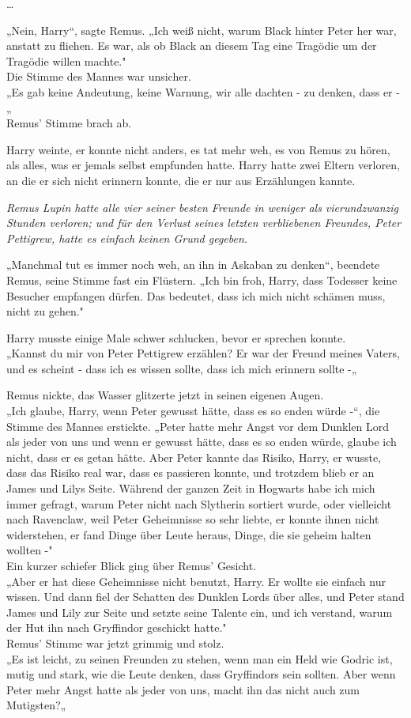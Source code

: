 {…

„Nein, Harry“, sagte Remus. „Ich weiß nicht, warum Black hinter Peter her war, anstatt zu fliehen. Es war, als ob Black an diesem Tag eine Tragödie um der Tragödie willen machte."\\ Die Stimme des Mannes war unsicher.\\ „Es gab keine Andeutung, keine Warnung, wir alle dachten - zu denken, dass er -„\\ Remus' Stimme brach ab.

Harry weinte, er konnte nicht anders, es tat mehr weh, es von Remus zu hören, als alles, was er jemals selbst empfunden hatte. Harry hatte zwei Eltern verloren, an die er sich nicht erinnern konnte, die er nur aus Erzählungen kannte.

\emph{Remus Lupin hatte alle vier seiner besten Freunde in weniger als vierundzwanzig Stunden verloren; und für den Verlust seines letzten verbliebenen Freundes, Peter Pettigrew, hatte es einfach keinen Grund gegeben.}

„Manchmal tut es immer noch weh, an ihn in Askaban zu denken“, beendete Remus, seine Stimme fast ein Flüstern. „Ich bin froh, Harry, dass Todesser keine Besucher empfangen dürfen. Das bedeutet, dass ich mich nicht schämen muss, nicht zu gehen."

Harry musste einige Male schwer schlucken, bevor er sprechen konnte.\\ „Kannst du mir von Peter Pettigrew erzählen? Er war der Freund meines Vaters, und es scheint - dass ich es wissen sollte, dass ich mich erinnern sollte -„

Remus nickte, das Wasser glitzerte jetzt in seinen eigenen Augen.\\ „Ich glaube, Harry, wenn Peter gewusst hätte, dass es so enden würde -“, die Stimme des Mannes erstickte. „Peter hatte mehr Angst vor dem Dunklen Lord als jeder von uns und wenn er gewusst hätte, dass es so enden würde, glaube ich nicht, dass er es getan hätte. Aber Peter kannte das Risiko, Harry, er wusste, dass das Risiko real war, dass es passieren konnte, und trotzdem blieb er an James und Lilys Seite. Während der ganzen Zeit in Hogwarts habe ich mich immer gefragt, warum Peter nicht nach Slytherin sortiert wurde, oder vielleicht nach Ravenclaw, weil Peter Geheimnisse so sehr liebte, er konnte ihnen nicht widerstehen, er fand Dinge über Leute heraus, Dinge, die sie geheim halten wollten -"\\ Ein kurzer schiefer Blick ging über Remus' Gesicht.\\ „Aber er hat diese Geheimnisse nicht benutzt, Harry. Er wollte sie einfach nur wissen. Und dann fiel der Schatten des Dunklen Lords über alles, und Peter stand James und Lily zur Seite und setzte seine Talente ein, und ich verstand, warum der Hut ihn nach Gryffindor geschickt hatte."\\ Remus' Stimme war jetzt grimmig und stolz.\\ „Es ist leicht, zu seinen Freunden zu stehen, wenn man ein Held wie Godric ist, mutig und stark, wie die Leute denken, dass Gryffindors sein sollten. Aber wenn Peter mehr Angst hatte als jeder von uns, macht ihn das nicht auch zum Mutigsten?„

}
